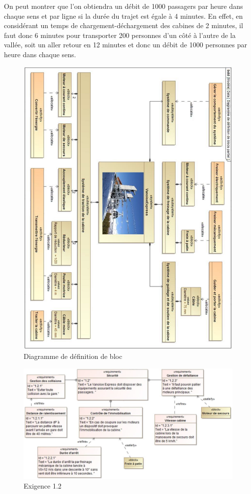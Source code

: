 On peut montrer que l'on obtiendra un débit de 1000 passagers par heure dans chaque sens et par ligne si la durée du trajet est égale à 4 minutes. En effet, en considérant un temps de chargement-déchargement des cabines de 2 minutes, il faut donc 6 minutes pour transporter 200 personnes d'un côté à l'autre de la vallée, soit un aller retour en 12 minutes et donc un débit de 1000 personnes par heure dans chaque sens.

\begin{figure}[!h]
\centering
\includegraphics[width=0.9\linewidth]{img/fig11}
\caption{Diagramme de définition de bloc}
\label{fig11}
\end{figure}

\begin{figure}[!h]
\centering
\includegraphics[width=0.75\linewidth]{img/fig12}
\caption{Exigence 1.2}
\label{fig12}
\end{figure}

